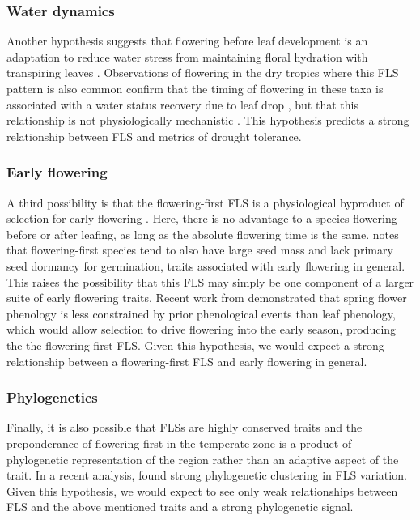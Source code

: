 \documentclass{article}
\begin{document}
\subsubsection*{Water dynamics}
\noindent Another hypothesis suggests that flowering before leaf development is an adaptation to reduce water stress from maintaining floral hydration with transpiring leaves \citep{Franklin2016}. Observations of flowering in the dry tropics where this FLS pattern is also common confirm that the timing of flowering in these taxa is associated with a water status recovery due to leaf drop \citep{Borchert1983,Reich1984}, but that this relationship is not physiologically mechanistic \citep{Franklin2016}. This hypothesis predicts a strong relationship between FLS and metrics of drought tolerance.

\subsubsection*{Early flowering}
\noindent A third possibility is that the flowering-first FLS is a physiological byproduct of selection for early flowering \citep{Primack1987}. Here, there is no advantage to a species flowering before or after leafing, as long as the absolute flowering time is the same. \citet{Primack1987} notes that flowering-first species tend to also have large seed mass and lack primary seed dormancy for germination, traits associated with early flowering in general. This raises the possibility that this FLS may simply be one component of a larger suite of early flowering traits. Recent work from \citet{Savage2019} demonstrated that spring flower phenology is less constrained by prior phenological events than leaf phenology, which would allow selection to drive flowering into the early season, producing the the flowering-first FLS. Given this hypothesis, we would expect a strong relationship between a flowering-first FLS and early flowering in general.
\subsubsection*{Phylogenetics} 
\noindent Finally, it is also possible that FLSs are highly conserved traits and the preponderance of flowering-first in the temperate zone is a product of phylogenetic representation of the region rather than an adaptive aspect of the trait. In a recent analysis, \citet{Gougherty2018} found strong phylogenetic clustering in FLS variation. Given this hypothesis, we would expect to see only weak relationships between FLS and the above mentioned traits and a strong phylogenetic signal.\\
\end{document}
